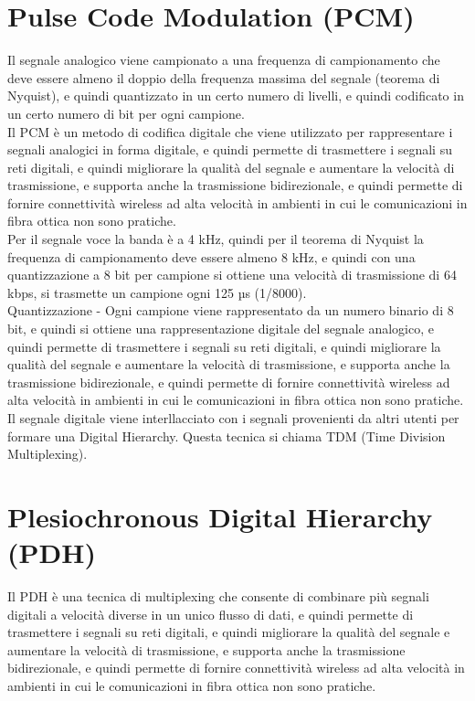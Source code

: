 \section{Pulse Code Modulation (PCM)}
Il segnale analogico viene campionato a una frequenza di campionamento che deve essere almeno il doppio della frequenza massima del segnale (teorema di Nyquist), e quindi quantizzato in un certo numero di livelli, e quindi codificato in un certo numero di bit per ogni campione.\\
Il PCM è un metodo di codifica digitale che viene utilizzato per rappresentare i segnali analogici in forma digitale, e quindi permette di trasmettere i segnali su reti digitali, e quindi migliorare la qualità del segnale e aumentare la velocità di trasmissione, e supporta anche la trasmissione bidirezionale, e quindi permette di fornire connettività wireless ad alta velocità in ambienti in cui le comunicazioni in fibra ottica non sono pratiche.\\

Per il segnale voce la banda è a 4 kHz, quindi per il teorema di Nyquist la frequenza di campionamento deve essere almeno 8 kHz, e quindi con una quantizzazione a 8 bit per campione si ottiene una velocità di trasmissione di 64 kbps, si trasmette un campione ogni 125 µs (1/8000).\\

Quantizzazione - Ogni campione viene rappresentato da un numero binario di 8 bit, e quindi si ottiene una rappresentazione digitale del segnale analogico, e quindi permette di trasmettere i segnali su reti digitali, e quindi migliorare la qualità del segnale e aumentare la velocità di trasmissione, e supporta anche la trasmissione bidirezionale, e quindi permette di fornire connettività wireless ad alta velocità in ambienti in cui le comunicazioni in fibra ottica non sono pratiche.\\

Il segnale digitale viene interllacciato con i segnali provenienti da altri utenti per formare una Digital Hierarchy. Questa tecnica si chiama TDM (Time Division Multiplexing).\\

\section{Plesiochronous Digital Hierarchy (PDH)}
Il PDH è una tecnica di multiplexing che consente di combinare più segnali digitali a velocità diverse in un unico flusso di dati, e quindi permette di trasmettere i segnali su reti digitali, e quindi migliorare la qualità del segnale e aumentare la velocità di trasmissione, e supporta anche la trasmissione bidirezionale, e quindi permette di fornire connettività wireless ad alta velocità in ambienti in cui le comunicazioni in fibra ottica non sono pratiche.\\

